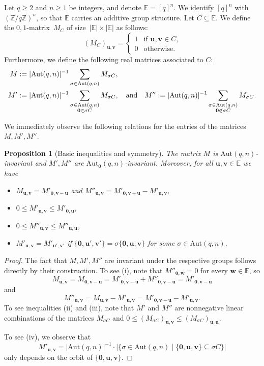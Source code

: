 \documentclass[10pt,a4paper]{article}
\newcommand{\E}{\mathbb{E}}
\newtheorem{proposition}[theorem]{Proposition}
\theoremstyle{definition}
\newcommand{\uu}{\mathbf{u}}
\newcommand{\vv}{\mathbf{v}}
\newcommand{\ww}{\mathbf{w}}
\newcommand{\zero}{\mathbf{0}}
\newcommand{\Aut}{\mathrm{Aut}}
\newcommand{\AutZ}{\mathrm{Aut}_{\zero}}
\begin{document}
Let $q\geq 2$ and $n\geq 1$ be integers, and denote $\E=[q]^n$. We identify $[q]^n$ with~$(\mathbb{Z}/q\mathbb{Z})^n$, so that $\E $ carries an additive group structure. Let $C\subseteq \E$. We define the $0,1$-matrix~$M_C$ of size~$|\E| \times |\E|$ as follows:
\[
(M_C)_{\uu,\vv} = \begin{cases} 1 &\text{if $\uu,\vv \in C$,} \\0 &\text{otherwise.}\end{cases} 
\]
Furthermore, we define the following real matrices associated to $C$:
\begin{align}
 M&:= |\Aut(q,n)|^{-1} \sum_{\sigma \in \Aut(q,n) } M_{\sigma C}, \notag \\
M'&:= |\Aut(q,n)|^{-1} \sum_{\substack{\sigma \in \Aut(q,n)\\ \zero \in \sigma C }} M_{\sigma C}, \quad \text{and} \quad
M'':= |\Aut(q,n)|^{-1} \sum_{\substack{\sigma \in \Aut(q,n)\\ \zero \not\in \sigma C }} M_{\sigma C}.
\end{align}

We immediately observe the following relations for the entries of the matrices $M,M',M''$.
\begin{proposition}[Basic inequalities and symmetry]\label{prop:first}
The matrix $M$ is $\Aut(q,n)$-invariant and $M',M''$ are $\AutZ(q,n)$-invariant. Moreover, for all $\uu,\vv\in\E$ we have
\begin{itemize}
\item[\textup{(i)}] $M_{\uu,\vv}=M'_{\zero,\vv-\uu}$ \quad and \quad $M''_{\uu,\vv}=M'_{\zero,\vv-\uu}-M'_{\uu,\vv}$,
\item[\textup{(ii)}] $0 \leq M'_{\uu,\vv} \leq M'_{\zero,\uu}$,
\item[\textup{(iii)}] $0 \leq M''_{\uu,\vv} \leq M''_{\uu,\uu}$, 
\item[\textup{(iv)}] $M'_{\uu,\vv}=M'_{\uu',\vv'}$ if $\{\zero,\uu',\vv'\}=\sigma\{\zero,\uu,\vv\}$ for some $\sigma\in \Aut(q,n)$.
\end{itemize}
\end{proposition}

\begin{proof}
The fact that $M,M',M''$ are invariant under the respective groups follows directly by their construction. To see (i), note that $M''_{\zero,\ww}=0$ for every $\ww\in \E$, so 
\[
M_{\uu,\vv}=M_{\zero, \vv-\uu}=M'_{\zero,\vv-\uu}+M''_{\zero,\vv-\uu}=M'_{\zero,\vv-\uu}
\]
and 
\[
M''_{\uu,\vv}=M_{\uu,\vv}-M'_{\uu,\vv}=M'_{\zero,\vv-\uu}-M'_{\uu,\vv}.
\]
To see inequalities (ii) and (iii), note that $M'$ and $M''$ are nonnegative linear combinations of the matrices $M_{\sigma C}$ and $0\leq \left(M_{\sigma C}\right)_{\uu,\vv}\leq\left(M_{\sigma C}\right)_{\uu,\uu}$. 

To see (iv), we observe that
\[
M'_{\uu,\vv}=|\Aut(q,n)|^{-1}\cdot |\{\sigma\in \Aut(q,n)\mid \{\zero,\uu,\vv\}\subseteq \sigma C\}|
\]
only depends on the orbit of $\{\zero,\uu,\vv\}$.
\end{proof}
\end{document}
